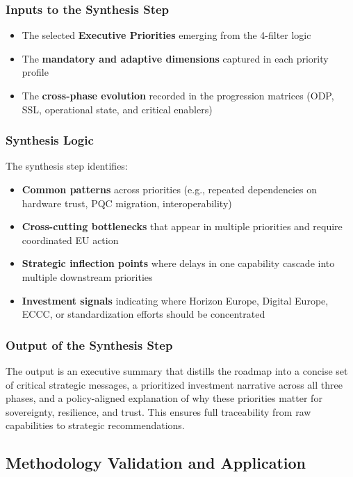 \documentclass{ieeeaccess}
\begin{document}
\subsubsection*{Inputs to the Synthesis Step}
\begin{itemize}
    \item The selected \textbf{Executive Priorities} emerging from the 4-filter logic
    \item The \textbf{mandatory and adaptive dimensions} captured in each priority profile
    \item The \textbf{cross-phase evolution} recorded in the progression matrices (ODP, SSL, operational state, and critical enablers)
\end{itemize}

\subsubsection*{Synthesis Logic}
The synthesis step identifies:
\begin{itemize}
    \item \textbf{Common patterns} across priorities (e.g., repeated dependencies on hardware trust, PQC migration, interoperability)
    \item \textbf{Cross-cutting bottlenecks} that appear in multiple priorities and require coordinated EU action
    \item \textbf{Strategic inflection points} where delays in one capability cascade into multiple downstream priorities
    \item \textbf{Investment signals} indicating where Horizon Europe, Digital Europe, ECCC, or standardization efforts should be concentrated
\end{itemize}

\subsubsection*{Output of the Synthesis Step}
The output is an executive summary that distills the roadmap into a concise set of critical strategic messages, a prioritized investment narrative across all three phases, and a policy-aligned explanation of why these priorities matter for sovereignty, resilience, and trust. This ensures full traceability from raw capabilities to strategic recommendations.

\subsection{Methodology Validation and Application}
\end{document}
